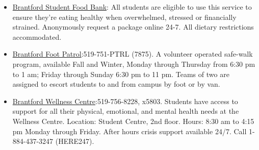 \documentclass[
  letterpaper,
  DIV=11,
  numbers=noendperiod]{scrartcl}
\begin{document}
\begin{itemize}
  \begin{itemize}
  \item
    \href{http://yourstudentsunion.ca/service/food-bank/}{Brantford
    Student Food Bank}: All students are eligible to use this service to
    ensure they're eating healthy when overwhelmed, stressed or
    financially strained. Anonymously request a package online 24-7. All
    dietary restrictions accommodated.
  \item
    \href{https://students.wlu.ca/wellness-and-recreation/safety/foot-patrol.html}{Brantford
    Foot Patrol}:519-751-PTRL (7875). A volunteer operated safe-walk
    program, available Fall and Winter, Monday through Thursday from
    6:30 pm to 1 am; Friday through Sunday 6:30 pm to 11 pm. Teams of
    two are assigned to escort students to and from campus by foot or by
    van.
  \item
    \href{https://students.wlu.ca/wellness-and-recreation/health-and-wellness/index.html}{Brantford
    Wellness Centre}:519-756-8228, x5803. Students have access to
    support for all their physical, emotional, and mental health needs
    at the Wellness Centre. Location: Student Centre, 2nd floor. Hours:
    8:30 am to 4:15 pm Monday through Friday. After hours crisis support
    available 24/7. Call 1-884-437-3247 (HERE247).
  \end{itemize}
\end{itemize}
\end{document}

